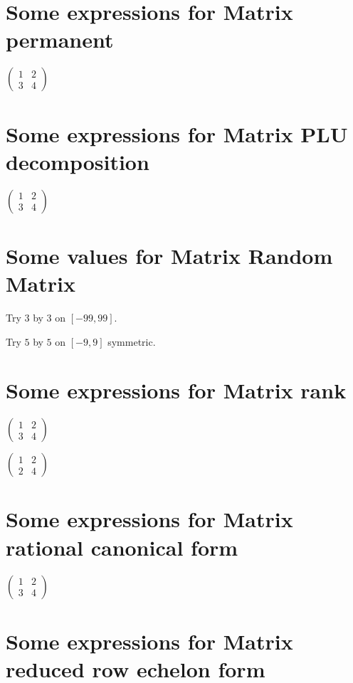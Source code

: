 \documentclass{article}
\begin{document}
\section{Some expressions for Matrix permanent}

$\left( 
\begin{array}{cc}
1 & 2 \\ 
3 & 4%
\end{array}%
\right) $

\section{Some expressions for Matrix PLU decomposition}

$\left( 
\begin{array}{cc}
1 & 2 \\ 
3 & 4%
\end{array}%
\right) $

\section{Some values for Matrix Random Matrix}

Try $3$ by $3$ on $[-99,99]$.

Try $5$ by $5$ on $[-9,9]$ symmetric.

\section{Some expressions for Matrix rank}

$\left( 
\begin{array}{cc}
1 & 2 \\ 
3 & 4%
\end{array}%
\right) $

$\left( 
\begin{array}{cc}
1 & 2 \\ 
2 & 4%
\end{array}%
\right) $

\section{Some expressions for Matrix rational canonical form}

$\left( 
\begin{array}{cc}
1 & 2 \\ 
3 & 4%
\end{array}%
\right) $

\section{Some expressions for Matrix reduced row echelon form}
\end{document}
